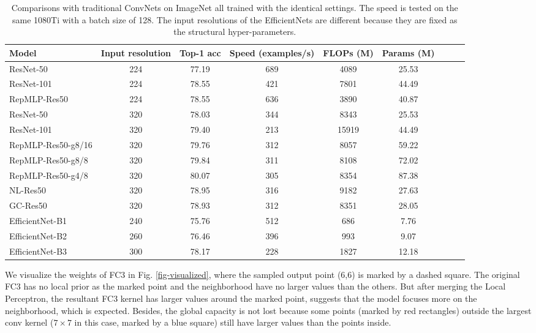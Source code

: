 \documentclass[10pt,twocolumn,letterpaper]{article}
\begin{document}
\setlength{\tabcolsep}{4pt}
\begin{table*}
	\caption{Comparisons with traditional ConvNets on ImageNet all trained with the identical settings. The speed is tested on the same 1080Ti with a batch size of 128. The input resolutions of the EfficientNets are different because they are fixed as the structural hyper-parameters.}
	\label{table-comparisons}
	\vspace{-0.2in}
	\begin{center}
		\small
		\begin{tabular}{lcccccccc}
			\hline
			Model			&	Input resolution&	Top-1 acc&	Speed (examples/s)	&	FLOPs (M)	&	Params (M)	\\
			\hline
			ResNet-50		&	224				&	77.19		&	689		&	4089	&	25.53			\\
			ResNet-101		&	224				&	78.55		&	421		&	7801	&	44.49			\\
RepMLP-Res50	&	224				&	78.55		&	636		&	3890	&	40.87			\\	\hline
			ResNet-50		&	320				&	78.03		&	344		&	8343	&	25.53			\\
			ResNet-101		&	320				&	79.40		&	213		&	15919	&	44.49			\\


			RepMLP-Res50-g8/16&	320				&	79.76		&	312		&	8057	&	59.22			\\		RepMLP-Res50-g8/8&	320				&	79.84		&	311		&	8108	&	72.02			\\		RepMLP-Res50-g4/8&	320				&	80.07		&	305		&	8354	&	87.38			\\		

			NL-Res50	&	320				&	78.95		&	316		&	9182	&	27.63			\\
			GC-Res50	&	320				&	78.93		&	312		&	8351	&	28.05			\\
			\hline
			EfficientNet-B1	&	240				&	75.76		&	512		&	686		&	7.76	\\
			EfficientNet-B2	&	260				&	76.46		&	396		&	993		&	9.07	\\
			EfficientNet-B3	&	300				&	78.17		&	228		&	1827	&	12.18	\\
			\hline
		\end{tabular}
	\end{center}
	\vspace{-0.25in}
\end{table*}
\setlength{\tabcolsep}{1.4pt}

We visualize the weights of FC3 in Fig. \ref{fig-visualized}, where the sampled output point (6,6) is marked by a dashed square. The original FC3 has no local prior as the marked point and the neighborhood have no larger values than the others. But after merging the Local Perceptron, the resultant FC3 kernel has larger values around the marked point, suggests that the model focuses more on the neighborhood, which is expected. Besides, the global capacity is not lost because some points (marked by red rectangles) outside the largest conv kernel ($7\times7$ in this case, marked by a blue square) still have larger values than the points inside.
\end{document}
